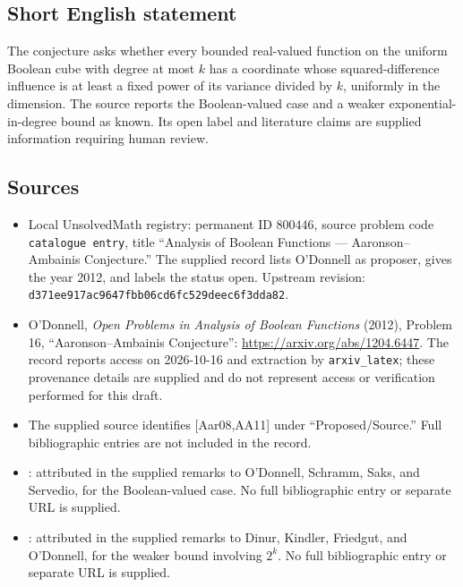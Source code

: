 \documentclass[11pt]{article}
\begin{document}
\subsection{Short English statement}
The conjecture asks whether every bounded real-valued function on the uniform Boolean cube with degree at most \(k\) has a coordinate whose squared-difference influence is at least a fixed power of its variance divided by \(k\), uniformly in the dimension. The source reports the Boolean-valued case and a weaker exponential-in-degree bound as known. Its open label and literature claims are supplied information requiring human review.
\subsection{Sources}
\begin{itemize}
\item Local UnsolvedMath registry: permanent ID \(800446\), source problem code \texttt{catalogue entry}, title ``Analysis of Boolean Functions --- Aaronson--Ambainis Conjecture.'' The supplied record lists O'Donnell as proposer, gives the year 2012, and labels the status open. Upstream revision: \texttt{d371ee917ac9647fbb06cd6fc529deec6f3dda82}.
\item O'Donnell, \emph{Open Problems in Analysis of Boolean Functions} (2012), Problem 16, ``Aaronson--Ambainis Conjecture'': \url{https://arxiv.org/abs/1204.6447}. The record reports access on 2026-10-16 and extraction by \texttt{arxiv\_latex}; these provenance details are supplied and do not represent access or verification performed for this draft.
\item The supplied source identifies [Aar08,AA11] under ``Proposed/Source.'' Full bibliographic entries are not included in the record.
\item [OSSS05]: attributed in the supplied remarks to O'Donnell, Schramm, Saks, and Servedio, for the Boolean-valued case. No full bibliographic entry or separate URL is supplied.
\item [DFKO07]: attributed in the supplied remarks to Dinur, Kindler, Friedgut, and O'Donnell, for the weaker bound involving \(2^k\). No full bibliographic entry or separate URL is supplied.
\end{itemize}
\end{document}
